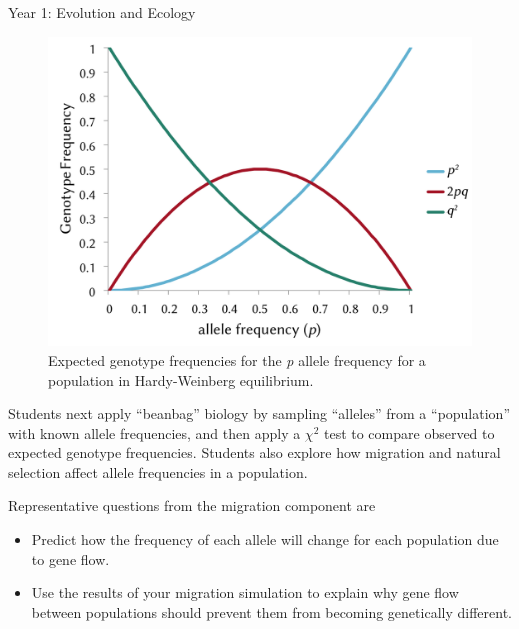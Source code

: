 \documentclass[final,hyperref={pdfpagelabels=false}]{beamer}
\newcommand{\whitespace}{\vspace{0.5\baselineskip}}
\newlength{\onecolwid}
\begin{document}
\begin{frame}[t]
\begin{columns}[t]
\begin{column}{\onecolwid}
\begin{block}{Year 1: Evolution and Ecology}
			\begin{figure}
				\includegraphics[width=\textwidth]{hwe_graph}
				\caption{Expected genotype frequencies for the \textit{p} allele frequency for a population in Hardy-Weinberg equilibrium.\label{fig:hwe}}
			\end{figure}
			
			\vspace*{\baselineskip}
			
			Students next apply “beanbag” biology \citep{jungck2010mathematical} by sampling “alleles” from a “population” with known allele frequencies, and then apply a $\chi^2$ test to compare observed to expected genotype frequencies. Students also explore how migration and natural selection affect allele frequencies in a population.
			
			\whitespace
			
			Representative questions from the migration component are
			
			\begin{itemize}\justifying
				\item Predict how the frequency of each allele will change for each population due to gene  flow.
				
				\item Use the results of your migration simulation to explain why gene flow between populations should prevent them from becoming genetically different.
			\end{itemize}
			
    	\end{block}
	\end{column}


\end{columns}
\end{frame}
\end{document}
